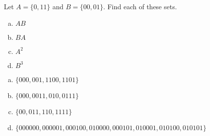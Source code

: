 \documentclass[../main.tex]{subfiles}
\begin{document}
Let $A = \{0, 11\}$ and $B = \{00, 01\}$.
Find each of these sets.
\begin{enumerate}[a)]
	\item $AB$
	\item $BA$
	\item $A^2$
	\item $B^3$
\end{enumerate}

\solution
\begin{enumerate}[a)]
	\item $\{000, 001, 1100, 1101\}$
	\item $\{000, 0011, 010, 0111\}$
	\item $\{00, 011, 110, 1111\}$
	\item $\{000000, 000001, 000100, 010000, 000101, 010001, 010100, 010101\}$
\end{enumerate}
\end{document}
